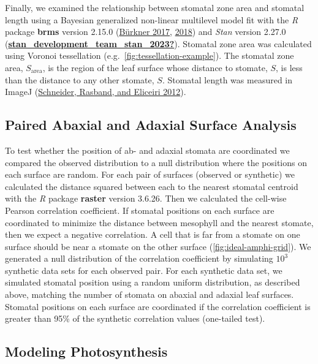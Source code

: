 \documentclass[12pt,halfline,a4paper,]{ouparticle}
\begin{document}
Finally, we examined the relationship between stomatal zone area and
stomatal length using a Bayesian generalized non-linear multilevel model
fit with the \emph{R} package \textbf{brms} version 2.15.0
(\protect\hyperlink{ref-burkner_brms_2017}{Bürkner 2017},
\protect\hyperlink{ref-burkner_advanced_2018}{2018}) and \emph{Stan}
version 2.27.0
(\protect\hyperlink{ref-stan_development_team_stan_2023}{\textbf{stan\_development\_team\_stan\_2023?}}).
Stomatal zone area was calculated using Voronoi tessellation
(e.g.~\autoref{fig:tessellation-example}). The stomatal zone area,
\(S_\text{area}\), is the region of the leaf surface whose distance to
stomate, \(S\), is less than the distance to any other stomate, \(S\).
Stomatal length was measured in ImageJ
(\protect\hyperlink{ref-schneider_nih_2012}{Schneider, Rasband, and
Eliceiri 2012}).

\hypertarget{paired-abaxial-and-adaxial-surface-analysis}{%
\subsection{Paired Abaxial and Adaxial Surface
Analysis}\label{paired-abaxial-and-adaxial-surface-analysis}}

To test whether the position of ab- and adaxial stomata are coordinated
we compared the observed distribution to a null distribution where the
positions on each surface are random. For each pair of surfaces
(observed or synthetic) we calculated the distance squared between each
to the nearest stomatal centroid with the \emph{R} package
\textbf{raster} version 3.6.26. Then we calculated the cell-wise Pearson
correlation coefficient. If stomatal positions on each surface are
coordinated to minimize the distance between mesophyll and the nearest
stomate, then we expect a negative correlation. A cell that is far from
a stomate on one surface should be near a stomate on the other surface
(\autoref{fig:ideal-amphi-grid}). We generated a null distribution of
the correlation coefficient by simulating \(10^3\) synthetic data sets
for each observed pair. For each synthetic data set, we simulated
stomatal position using a random uniform distribution, as described
above, matching the number of stomata on abaxial and adaxial leaf
surfaces. Stomatal positions on each surface are coordinated if the
correlation coefficient is greater than 95\% of the synthetic
correlation values (one-tailed test).

\hypertarget{modeling-photosynthesis}{%
\subsection{Modeling Photosynthesis}\label{modeling-photosynthesis}}
\end{document}
